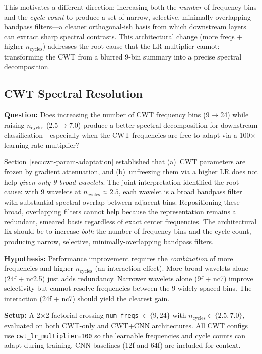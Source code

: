 \documentclass[11pt, a4paper]{article}
\begin{document}
This motivates a different direction: increasing both the
\emph{number} of frequency bins and the \emph{cycle count} to produce
a set of narrow, selective, minimally-overlapping bandpass filters---a
cleaner orthogonal-ish basis from which downstream layers can extract
sharp spectral contrasts. This architectural change (more freqs +
higher $n_\text{cycles}$) addresses the root cause that the LR
multiplier cannot: transforming the CWT from a blurred 9-bin summary
into a precise spectral decomposition.


\subsection{CWT Spectral Resolution}
\label{sec:cwt-spectral-resolution}

\textbf{Question:} Does increasing the number of CWT frequency bins
(9$\to$24) while raising $n_\text{cycles}$ (2.5$\to$7.0) produce a
better spectral decomposition for downstream classification---especially
when the CWT frequencies are free to adapt via a 100$\times$ learning
rate multiplier?

Section~\ref{sec:cwt-param-adaptation} established that (a)~CWT
parameters are frozen by gradient attenuation, and (b)~unfreezing them
via a higher LR does not help \emph{given only 9 broad wavelets}.  The
joint interpretation identified the root cause: with 9 wavelets at
$n_\text{cycles} \approx 2.5$, each wavelet is a broad bandpass filter
with substantial spectral overlap between adjacent bins.  Repositioning
these broad, overlapping filters cannot help because the representation
remains a redundant, smeared basis regardless of exact center
frequencies.  The architectural fix should be to increase \emph{both}
the number of frequency bins and the cycle count, producing narrow,
selective, minimally-overlapping bandpass filters.

\textbf{Hypothesis:} Performance improvement requires the
\emph{combination} of more frequencies and higher $n_\text{cycles}$
(an interaction effect).  More broad wavelets alone (24f + nc2.5) just
adds redundancy.  Narrower wavelets alone (9f + nc7) improve
selectivity but cannot resolve frequencies between the 9 widely-spaced
bins.  The interaction (24f + nc7) should yield the clearest gain.

\textbf{Setup:} A 2$\times$2 factorial crossing \texttt{num\_freqs}
$\in \{9, 24\}$ with $n_\text{cycles} \in \{2.5, 7.0\}$, evaluated on
both CWT-only and CWT+CNN architectures.  All CWT configs use
\texttt{cwt\_lr\_multiplier=100} so the learnable frequencies and cycle
counts can adapt during training.  CNN baselines (12f and 64f) are
included for context.
\end{document}
